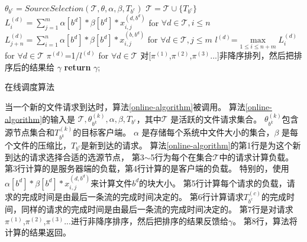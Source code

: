 \begin{algorithm}
\KwOut{$\gamma$}
 $\theta_{b^c}= SourceSelection(\mathcal{T},\theta,\alpha,\beta,T_{b^c})$\;
 $\mathcal{T} = \mathcal{T} \cup \{T_{b^c}\}$\;
$L_i^{(d)}= \sum_{j=1}^{m}\alpha[b^d]*\beta[b^d]*x_{i,j}^{(d,b^d)}$ for $\forall d \in \mathcal{T},i \le n$\;
$L_{j+n}^{(d)}= \sum_{i=1}^n\alpha[b^d]*\beta[b^d]*x_{i,j}^{(b,b^d)}$ for $\forall d \in \mathcal{T},j \le m$\;
$l^{(d)}$=$ \max \limits_{1 \le i \le n+m}L_i^{(d)}$ for $\forall d \in\mathcal{T}$ \;
$\pi^{(d)}$=1/$l^{(d)}$ for $\forall d \in \mathcal{T}$ \;
对[$\pi^{(1)}$,$\pi^{(2)}$,$\pi^{(3)}$...]非降序排列，然后把排序后的结果给 $\gamma$\;
  \textbf{return} $\gamma$;
\caption{在线调度算法}
\label{online-algorithm}
\end{algorithm}

当一个新的文件请求到达时，算法\ref{online-algorithm}被调用。
算法\ref{online-algorithm}的输入是 $\mathcal{T},\theta_{b^k}^{(k)},\alpha,\beta,T_{b^c}$，其中$\mathcal{T}$ 是活跃的文件请求集合。
$\theta_{b^k}^{(k)}$包含源节点集合和$T^{(k)}_{b^k}$的目标客户端。
$\alpha$ 是存储每个系统中文件大小的集合，$\beta$ 是每个文件的压缩比，$T_{b^c}$是新到达的请求。
算法\ref{online-algorithm}的第1行是为这个新到达的请求选择合适的选源节点，
第3$\sim$5行为每个在集合$\mathcal{T}$中的请求计算负载。
第3行计算的是服务器端的负载，第4行计算的是客户端的负载。
特别的，使用$\alpha[b^d]*\beta[b^d]*x_{i,j}^{(d,b^d)}$来计算文件$b^d$的块大小。
第5行计算每个请求的负载，请求的完成时间是由最后一条流的完成时间决定的。
第6行计算请求$T^{(c)}_{b^c}$的完成时间，同样的请求的完成时间是由最后一条流的完成时间决定的。
第7行是对请求$\pi^{(1)}$,$\pi^{(2)}$,$\pi^{(3)}$...进行非降序排序，然后把排序的结果反馈给$\gamma$。
第8行，算法将计算的结果返回。

